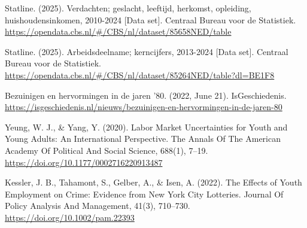 \documentclass[
]{article}
\begin{document}
Statline. (2025). Verdachten; geslacht, leeftijd, herkomst, opleiding,
huishoudensinkomen, 2010-2024 {[}Data set{]}. Centraal Bureau voor de
Statistiek.
\url{https://opendata.cbs.nl/\#/CBS/nl/dataset/85658NED/table}

Statline. (2025). Arbeidsdeelname; kerncijfers, 2013-2024 {[}Data
set{]}. Centraal Bureau voor de Statistiek.
\url{https://opendata.cbs.nl/\#/CBS/nl/dataset/85264NED/table?dl=BE1F8}

Bezuinigen en hervormingen in de jaren '80. (2022, June 21).
IsGeschiedenis.
\url{https://isgeschiedenis.nl/nieuws/bezuinigen-en-hervormingen-in-de-jaren-80}

Yeung, W. J., \& Yang, Y. (2020). Labor Market Uncertainties for Youth
and Young Adults: An International Perspective. The Annals Of The
American Academy Of Political And Social Science, 688(1), 7--19.
\url{https://doi.org/10.1177/0002716220913487}

Kessler, J. B., Tahamont, S., Gelber, A., \& Isen, A. (2022). The
Effects of Youth Employment on Crime: Evidence from New York City
Lotteries. Journal Of Policy Analysis And Management, 41(3), 710--730.
\url{https://doi.org/10.1002/pam.22393}
\end{document}

